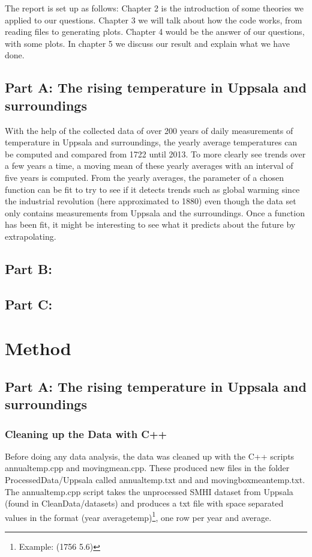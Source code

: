 \documentclass[a4paper]{article}
\begin{document}
The report is set up as follows: Chapter 2 is the introduction of some theories we applied to our questions. Chapter 3 we will talk about how the code works, from reading files to generating plots. Chapter 4 would be the answer of our questions, with some plots. In chapter 5 we discuss our result and explain what we have done.

\subsection{Part A: The rising temperature in Uppsala and surroundings}
With the help of the collected data of over 200 years of daily measurements of temperature in Uppsala and surroundings, the yearly average temperatures can be computed and compared from 1722 until 2013. To more clearly see trends over a few years a time, a moving mean of these yearly averages with an interval of five years is computed.  From the yearly averages, the parameter of a chosen function can be fit to try to see if it detects trends such as global warming since the industrial revolution (here approximated to 1880) even though the data set only contains measurements from Uppsala and the surroundings. Once a function has been fit, it might be interesting to see what it predicts about the future by extrapolating.

\subsection{Part B:}

\subsection{Part C:}


\section{Method}

\subsection{Part A: The rising temperature in Uppsala and surroundings}
\subsubsection{Cleaning up the Data with C++}
Before doing any data analysis, the data was cleaned up with the C++ scripts annualtemp.cpp and movingmean.cpp. These produced new files in the folder ProcessedData/Uppsala called annualtemp.txt and and movingboxmeantemp.txt. The annualtemp.cpp script takes the unprocessed SMHI dataset from Uppsala (found in CleanData/datasets) and produces a txt file with space separated values in the format (year averagetemp)\footnote{Example: (1756 5.6)}, one row per year and average. 
\end{document}

